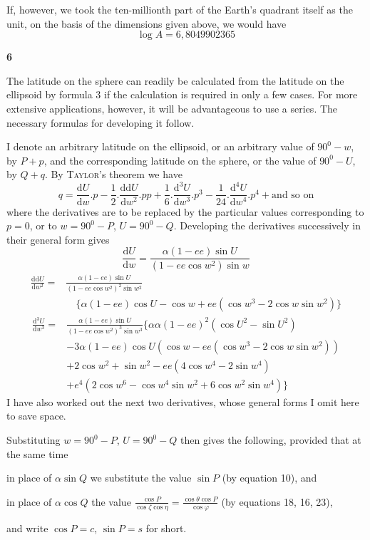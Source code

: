 %
\noindent If, however, we took the ten-millionth part of the Earth’s quadrant itself as the unit, on the basis of the dimensions given above, we would have
\[
\log A=6{,}8049902365
\]
\par\medskip{}\centerline{\textbf{6}}\nobreak\smallskip
\indent The latitude on the sphere can readily be calculated from the latitude on the ellipsoid by formula 3 if the calculation is required in only a few cases. For more extensive applications, however, it will be advantageous to use a series. The necessary formulas for developing it follow.

I denote an arbitrary latitude on the ellipsoid, or an arbitrary value of \(90^0-w\), by \(P+p\), and the corresponding latitude on the sphere, or the value of \(90^0-U\), by \(Q+q\). By \textsc{Taylor}'s theorem we have
\[
q=\frac{\mathrm{d}U}{\mathrm{d}w}\mathord{.}p-\frac{1}{2}\mathord{.}\frac{\mathrm{dd}U}{\mathrm{d}w^2}\mathord{.}pp+\frac{1}{6}\mathord{.}\frac{\mathrm{d}^3U}{\mathrm{d}w^3}\mathord{.}p^3-\frac{1}{24}\mathord{.}\frac{\mathrm{d}^4U}{\mathrm{d}w^4}\mathord{.}p^4+\text{and so on}
\]
where the derivatives are to be replaced by the particular values corresponding to \(p=0\), or to \(w=90^0-P\), \(U=90^0-Q\). Developing the derivatives successively in their general form gives
\[
\frac{\mathrm{d}U}{\mathrm{d}w}=\frac{\alpha(1-ee)\sin U}{(1-ee\cos w^2)\sin w}
\]
\[
\begin{aligned}
\frac{\mathrm{dd}U}{\mathrm{d}w^2}={}&\frac{\alpha(1-ee)\sin U}{(1-ee\cos w^2)^2\sin w^2}\\
&\quad\{\alpha(1-ee)\cos U-\cos w+ee(\cos w^3-2\cos w\sin w^2)\}
\end{aligned}
\]
\[
\begin{aligned}
\frac{\mathrm{d}^3U}{\mathrm{d}w^3}={}&\frac{\alpha(1-ee)\sin U}{(1-ee\cos w^2)^3\sin w^3}\{\alpha\alpha(1-ee)^2(\cos U^2-\sin U^2)\\
&-3\alpha(1-ee)\cos U(\cos w-ee(\cos w^3-2\cos w\sin w^2))\\
&+2\cos w^2+\sin w^2-ee(4\cos w^4-2\sin w^4)\\
&+e^4(2\cos w^6-\cos w^4\sin w^2+6\cos w^2\sin w^4)\}
\end{aligned}
\]
I have also worked out the next two derivatives, whose general forms I omit here to save space.

Substituting \(w=90^0-P\), \(U=90^0-Q\) then gives the following, provided that at the same time
\par\noindent in place of \(\alpha\sin Q\) we substitute the value \(\sin P\) (by equation 10), and
\par\noindent in place of \(\alpha\cos Q\) the value \(\frac{\cos P}{\cos\zeta\cos\eta}=\frac{\cos\theta\cos P}{\cos\varphi}\) (by equations 18, 16, 23),
\par\noindent and write \(\cos P=c\), \(\sin P=s\) for short.
